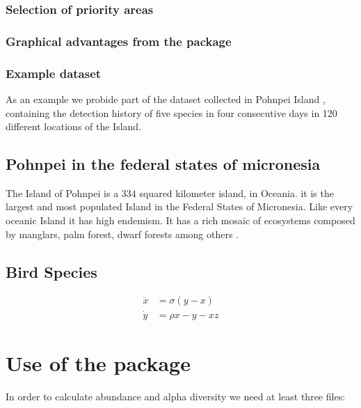 \documentclass[article]{jss}
\begin{document}
\subsubsection{Selection of priority
areas}\label{selection-of-priority-areas}

\subsubsection{Graphical advantages from the
package}\label{graphical-advantages-from-the-package}

\subsubsection{Example dataset}\label{example-dataset}

As an example we probide part of the dataset collected in Pohnpei Island
\citep{oleiro2014avian}, containing the detection history of five
species in four consecutive days in 120 different locations of the
Island.

\subsection{Pohnpei in the federal states of
micronesia}\label{pohnpei-in-the-federal-states-of-micronesia}

The Island of Pohnpei is a 334 squared kilometer island, in Oceania. it
is the largest and most populated Island in the Federal States of
Micronesia. Like every oceanic Island it has high endemism. It has a
rich mosaic of ecosystems composed by manglars, palm forest, dwarf
forests among others
\citep{raynor1994resource, buden2000comparison, merlin2005kava}.

\subsection{Bird Species}\label{bird-species}

\[
\begin{aligned}
  \dot{x} & = \sigma(y-x) \\
  \dot{y} & = \rho x- y - xz 
\end{aligned}
\]

\section{Use of the package}\label{use-of-the-package}

In order to calculate abundance and alpha diversity we need at least
three files:
\end{document}
